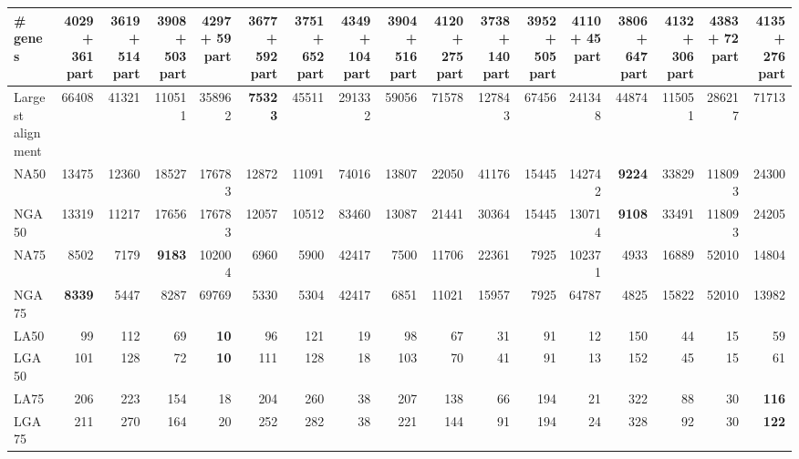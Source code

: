 \documentclass[12pt,a4paper]{article}
\begin{document}
\begin{table}[ht]
\begin{center}
\begin{tabular}{|l*{16}{|r}|}
\# genes & 4029 + 361 part & 3619 + 514 part & 3908 + 503 part & 4297 + 59 part & 3677 + 592 part & 3751 + 652 part & 4349 + 104 part & 3904 + 516 part & 4120 + 275 part & 3738 + 140 part & 3952 + 505 part & 4110 + 45 part & 3806 + 647 part & 4132 + 306 part & {\bf 4383 + 72 part} & 4135 + 276 part \\ \hline
Largest alignment & 66408 & 41321 & 110511 & 358962 & {\bf 75323} & 45511 & 291332 & 59056 & 71578 & 127843 & 67456 & 241348 & 44874 & 115051 & 286217 & 71713 \\ \hline
NA50 & 13475 & 12360 & 18527 & 176783 & 12872 & 11091 & 74016 & 13807 & 22050 & 41176 & 15445 & 142742 & {\bf 9224} & 33829 & 118093 & 24300 \\ \hline
NGA50 & 13319 & 11217 & 17656 & 176783 & 12057 & 10512 & 83460 & 13087 & 21441 & 30364 & 15445 & 130714 & {\bf 9108} & 33491 & 118093 & 24205 \\ \hline
NA75 & 8502 & 7179 & {\bf 9183} & 102004 & 6960 & 5900 & 42417 & 7500 & 11706 & 22361 & 7925 & 102371 & 4933 & 16889 & 52010 & 14804 \\ \hline
NGA75 & {\bf 8339} & 5447 & 8287 & 69769 & 5330 & 5304 & 42417 & 6851 & 11021 & 15957 & 7925 & 64787 & 4825 & 15822 & 52010 & 13982 \\ \hline
LA50 & 99 & 112 & 69 & {\bf 10} & 96 & 121 & 19 & 98 & 67 & 31 & 91 & 12 & 150 & 44 & 15 & 59 \\ \hline
LGA50 & 101 & 128 & 72 & {\bf 10} & 111 & 128 & 18 & 103 & 70 & 41 & 91 & 13 & 152 & 45 & 15 & 61 \\ \hline
LA75 & 206 & 223 & 154 & 18 & 204 & 260 & 38 & 207 & 138 & 66 & 194 & 21 & 322 & 88 & 30 & {\bf 116} \\ \hline
LGA75 & 211 & 270 & 164 & 20 & 252 & 282 & 38 & 221 & 144 & 91 & 194 & 24 & 328 & 92 & 30 & {\bf 122} \\ \hline
\end{tabular}
\end{center}
\end{table}
\end{document}
